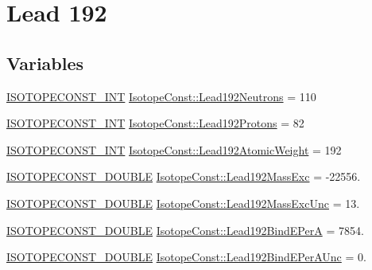 \hypertarget{group___isotope_const-_lead-_pb192}{}\section{Lead 192}
\label{group___isotope_const-_lead-_pb192}
\subsection*{Variables}
\begin{DoxyCompactItemize}
\item 
\mbox{\hyperlink{group___isotope_const-_macros_ga5f18360b3e99483a35c32d789e62621c}{I\+S\+O\+T\+O\+P\+E\+C\+O\+N\+S\+T\+\_\+\+I\+NT}} \mbox{\hyperlink{group___isotope_const-_lead-_pb192_ga2aed9715774b9c358d2069a0bcfab72e}{Isotope\+Const\+::\+Lead192\+Neutrons}} = 110
\item 
\mbox{\hyperlink{group___isotope_const-_macros_ga5f18360b3e99483a35c32d789e62621c}{I\+S\+O\+T\+O\+P\+E\+C\+O\+N\+S\+T\+\_\+\+I\+NT}} \mbox{\hyperlink{group___isotope_const-_lead-_pb192_gab202f9f704b254255b4dac7b64f4ebaf}{Isotope\+Const\+::\+Lead192\+Protons}} = 82
\item 
\mbox{\hyperlink{group___isotope_const-_macros_ga5f18360b3e99483a35c32d789e62621c}{I\+S\+O\+T\+O\+P\+E\+C\+O\+N\+S\+T\+\_\+\+I\+NT}} \mbox{\hyperlink{group___isotope_const-_lead-_pb192_gab6199bbeeb65f578d7558358703e8e85}{Isotope\+Const\+::\+Lead192\+Atomic\+Weight}} = 192
\item 
\mbox{\hyperlink{group___isotope_const-_macros_ga8f45a7272ce02c0b4c65c44636ed719a}{I\+S\+O\+T\+O\+P\+E\+C\+O\+N\+S\+T\+\_\+\+D\+O\+U\+B\+LE}} \mbox{\hyperlink{group___isotope_const-_lead-_pb192_ga9097daba7e1b3b34dbd6ac27f7079841}{Isotope\+Const\+::\+Lead192\+Mass\+Exc}} = -\/22556.
\item 
\mbox{\hyperlink{group___isotope_const-_macros_ga8f45a7272ce02c0b4c65c44636ed719a}{I\+S\+O\+T\+O\+P\+E\+C\+O\+N\+S\+T\+\_\+\+D\+O\+U\+B\+LE}} \mbox{\hyperlink{group___isotope_const-_lead-_pb192_gabf0a96fc653b5a72bff4b08cf56ed2dd}{Isotope\+Const\+::\+Lead192\+Mass\+Exc\+Unc}} = 13.
\item 
\mbox{\hyperlink{group___isotope_const-_macros_ga8f45a7272ce02c0b4c65c44636ed719a}{I\+S\+O\+T\+O\+P\+E\+C\+O\+N\+S\+T\+\_\+\+D\+O\+U\+B\+LE}} \mbox{\hyperlink{group___isotope_const-_lead-_pb192_ga7c4c01af0ff798687791ab5627b49a39}{Isotope\+Const\+::\+Lead192\+Bind\+E\+PerA}} = 7854.
\item 
\mbox{\hyperlink{group___isotope_const-_macros_ga8f45a7272ce02c0b4c65c44636ed719a}{I\+S\+O\+T\+O\+P\+E\+C\+O\+N\+S\+T\+\_\+\+D\+O\+U\+B\+LE}} \mbox{\hyperlink{group___isotope_const-_lead-_pb192_gad83f082f5e0d3783c3dfc97019f7db81}{Isotope\+Const\+::\+Lead192\+Bind\+E\+Per\+A\+Unc}} = 0.

\end{DoxyCompactItemize}
